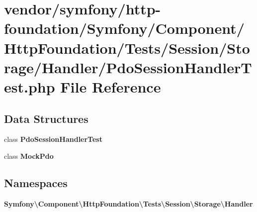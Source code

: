 \section{vendor/symfony/http-\/foundation/\+Symfony/\+Component/\+Http\+Foundation/\+Tests/\+Session/\+Storage/\+Handler/\+Pdo\+Session\+Handler\+Test.php File Reference}
\label{_pdo_session_handler_test_8php}
\subsection*{Data Structures}
\begin{DoxyCompactItemize}
\item 
class {\bf Pdo\+Session\+Handler\+Test}
\item 
class {\bf Mock\+Pdo}
\end{DoxyCompactItemize}
\subsection*{Namespaces}
\begin{DoxyCompactItemize}
\item 
 {\bf Symfony\textbackslash{}\+Component\textbackslash{}\+Http\+Foundation\textbackslash{}\+Tests\textbackslash{}\+Session\textbackslash{}\+Storage\textbackslash{}\+Handler}
\end{DoxyCompactItemize}
